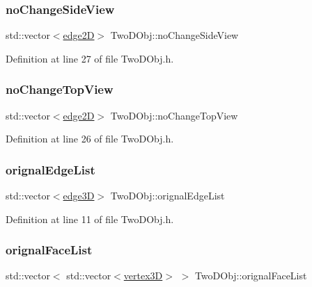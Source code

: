 \subsubsection{\texorpdfstring{no\+Change\+Side\+View}{noChangeSideView}}
{\footnotesize\ttfamily std\+::vector$<$\mbox{\hyperlink{structedge2_d}{edge2D}}$>$ Two\+D\+Obj\+::no\+Change\+Side\+View}



Definition at line 27 of file Two\+D\+Obj.\+h.

\mbox{\label{class_two_d_obj_aac0ab19af33023cf9cb3239ba1f808a0}} 
\subsubsection{\texorpdfstring{no\+Change\+Top\+View}{noChangeTopView}}
{\footnotesize\ttfamily std\+::vector$<$\mbox{\hyperlink{structedge2_d}{edge2D}}$>$ Two\+D\+Obj\+::no\+Change\+Top\+View}



Definition at line 26 of file Two\+D\+Obj.\+h.

\mbox{\label{class_two_d_obj_a00ba44029623eca2c1f2b34a70f7035d}} 
\subsubsection{\texorpdfstring{orignal\+Edge\+List}{orignalEdgeList}}
{\footnotesize\ttfamily std\+::vector$<$\mbox{\hyperlink{structedge3_d}{edge3D}}$>$ Two\+D\+Obj\+::orignal\+Edge\+List}



Definition at line 11 of file Two\+D\+Obj.\+h.

\mbox{\label{class_two_d_obj_ad71fe1f675c3e1f8fe2a21c8bbc3149e}} 
\subsubsection{\texorpdfstring{orignal\+Face\+List}{orignalFaceList}}
{\footnotesize\ttfamily std\+::vector$<$ std\+::vector$<$\mbox{\hyperlink{structvertex3_d}{vertex3D}}$>$ $>$ Two\+D\+Obj\+::orignal\+Face\+List}




